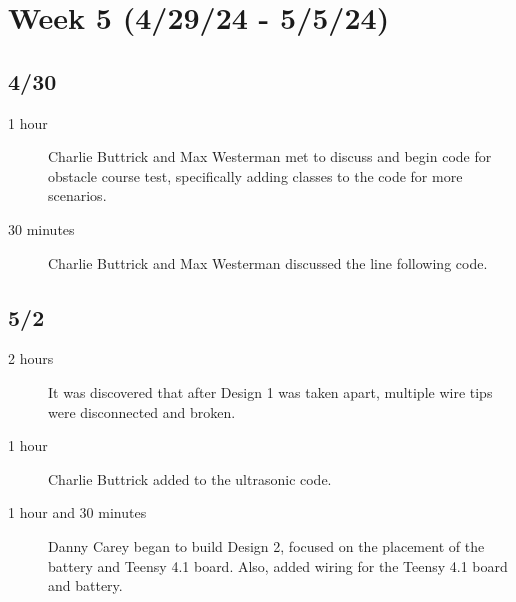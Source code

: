 \documentclass[11pt]{report}
\begin{document}
\section{Week 5 (4/29/24 - 5/5/24)}
\begin{adjustwidth}{0.5cm}{0cm}
\subsection*{4/30}
\begin{greylineformat}
\begin{description}
    \item [1 hour] Charlie Buttrick and Max Westerman met to discuss and begin code for obstacle course test, specifically adding classes to the code for more scenarios. 
    \item [30 minutes] Charlie Buttrick and Max Westerman discussed the line following code. 
\end{description}\end{greylineformat}


\vspace{-2.1em}\subsection*{5/2}
\begin{greylineformat}
\begin{description}
    \item [2 hours] It was discovered that after Design 1 was taken apart, multiple wire tips were disconnected and broken.
    \item [1 hour] Charlie Buttrick added to the ultrasonic code. 
    \item [1 hour and 30 minutes] Danny Carey began to build Design 2, focused on the placement of the battery and Teensy 4.1 board. Also, added wiring for the Teensy 4.1 board and battery. 
\end{description}\end{greylineformat}


\end{adjustwidth}
\end{document}
